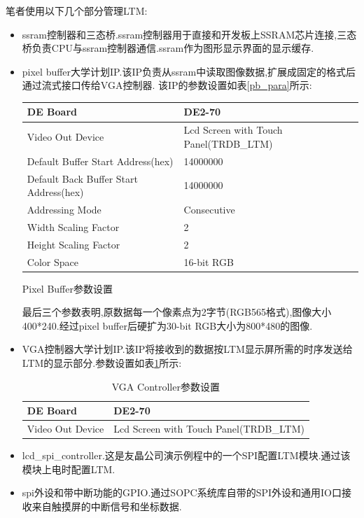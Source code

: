 \documentclass[12pt,a4paper,titlepage]{article}
\begin{document}
笔者使用以下几个部分管理LTM:
\begin{itemize}
\item ssram控制器和三态桥.ssram控制器用于直接和开发板上SSRAM芯片连接,三态桥负责CPU与ssram控制器通信.ssram作为图形显示界面的显示缓存.
\item pixel buffer大学计划IP.该IP负责从ssram中读取图像数据,扩展成固定的格式后通过流式接口传给VGA控制器.
该IP的参数设置如表\ref{pb_para}所示:

\begin{threeparttable}
\begin{tabular}{|l|l|}
\hline
DE Board & DE2-70 \\\hline
Video Out Device & Lcd Screen with Touch Panel(TRDB\_LTM)\\\hline
Default Buffer Start Address(hex) & 14000000\tnote{1}\\\hline
Default Back Buffer Start Address(hex) & 14000000\tnote{2}\\\hline
Addressing Mode & Consecutive\tnote{3}\\\hline
Width Scaling Factor & 2\\\hline
Height Scaling Factor & 2\\\hline
Color Space & 16-bit RGB\\\hline
\end{tabular}
\caption{Pixel Buffer参数设置\label{pb_para}}
\end{threeparttable}
最后三个参数表明,原数据每一个像素点为2字节(RGB565格式),图像大小400*240.经过pixel buffer后硬扩为30-bit RGB大小为800*480的图像.
\item VGA控制器大学计划IP.该IP将接收到的数据按LTM显示屏所需的时序发送给LTM的显示部分.参数设置如表\ref{vc_para}所示:
\begin{table}[!h]
\centering
\begin{tabular}{|l|l|}
\hline
DE Board & DE2-70\\\hline
Video Out Device & Lcd Screen with Touch Panel(TRDB\_LTM)\\\hline
\end{tabular}
\caption{VGA Controller参数设置\label{vc_para}}
\end{table}
\item lcd\_spi\_controller.这是友晶公司演示例程中的一个SPI配置LTM模块.通过该模块上电时配置LTM.
\item spi外设和带中断功能的GPIO.通过SOPC系统库自带的SPI外设和通用IO口接收来自触摸屏的中断信号和坐标数据.
\end{itemize}
\end{document}
